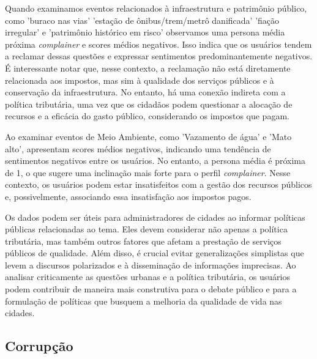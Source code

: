 Quando examinamos eventos relacionados à infraestrutura e patrimônio público, como 'buraco nas vias' 'estação de ônibus/trem/metrô danificada' 'fiação irregular' e 'patrimônio histórico em risco' observamos uma persona média próxima \textit{complainer} e scores médios negativos. Isso indica que os usuários tendem a reclamar dessas questões e expressar sentimentos predominantemente negativos. É interessante notar que, nesse contexto, a reclamação não está diretamente relacionada aos impostos, mas sim à qualidade dos serviços públicos e à conservação da infraestrutura. No entanto, há uma conexão indireta com a política tributária, uma vez que os cidadãos podem questionar a alocação de recursos e a eficácia do gasto público, considerando os impostos que pagam.

Ao examinar eventos de Meio Ambiente, como 'Vazamento de água' e 'Mato alto', apresentam scores médios negativos, indicando uma tendência de sentimentos negativos entre os usuários. No entanto, a persona média é próxima de 1, o que sugere uma inclinação mais forte para o perfil \textit{complainer}. Nesse contexto, os usuários podem estar insatisfeitos com a gestão dos recursos públicos e, possivelmente, associando essa insatisfação aos impostos pagos.

Os dados podem ser úteis para administradores de cidades ao informar políticas públicas relacionadas ao tema. Eles devem considerar não apenas a política tributária, mas também outros fatores que afetam a prestação de serviços públicos de qualidade. Além disso, é crucial evitar generalizações simplistas que levem a discursos polarizados e à disseminação de informações imprecisas. Ao analisar criticamente as questões urbanas e a política tributária, os usuários podem contribuir de maneira mais construtiva para o debate público e para a formulação de políticas que busquem a melhoria da qualidade de vida nas cidades.

\subsection{Corrupção}
\label{sec:eventos_populares_corruption}


